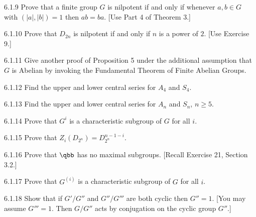 \begin{exercise}{6.1.9}
    Prove that a finite group $G$ is nilpotent if and only if whenever $a, b \in G$ with $(|a|, |b|) = 1$ then $ab = ba$.
    [Use Part 4 of Theorem 3.]
\end{exercise}

\begin{exercise}{6.1.10}
    Prove that $D_{2n}$ is nilpotent if and only if $n$ is a power of $2$.
    [Use Exercise 9.]
\end{exercise}

\begin{exercise}{6.1.11}
    Give another proof of Proposition 5 under the additional assumption that $G$ is Abelian by invoking the Fundamental Theorem of Finite Abelian Groups.
\end{exercise}

\begin{exercise}{6.1.12}
    Find the upper and lower central series for $A_4$ and $S_4$.
\end{exercise}

\begin{exercise}{6.1.13}
    Find the upper and lower central series for $A_n$ and $S_n$, $n \geq 5$.
\end{exercise}

\begin{exercise}{6.1.14}
    Prove that $G^i$ is a characteristic subgroup of $G$ for all $i$.
\end{exercise}

\begin{exercise}{6.1.15}
    Prove that $Z_i(D_{2^n}) = D_{2^n}^{n-1-i}$.
\end{exercise}

\begin{exercise}{6.1.16}
    Prove that $\qbb$ has no maximal subgroups.
    [Recall Exercise 21, Section 3.2.]
\end{exercise}

\begin{exercise}{6.1.17}
    Prove that $G^{(i)}$ is a characteristic subgroup of $G$ for all $i$.
\end{exercise}

\begin{exercise}{6.1.18}
    Show that if $G'/G''$ and $G''/G'''$ are both cyclic then $G'' = 1$.
    [You may assume $G''' = 1$. Then $G/G''$ acts by conjugation on the cyclic group $G''$.]
\end{exercise}

